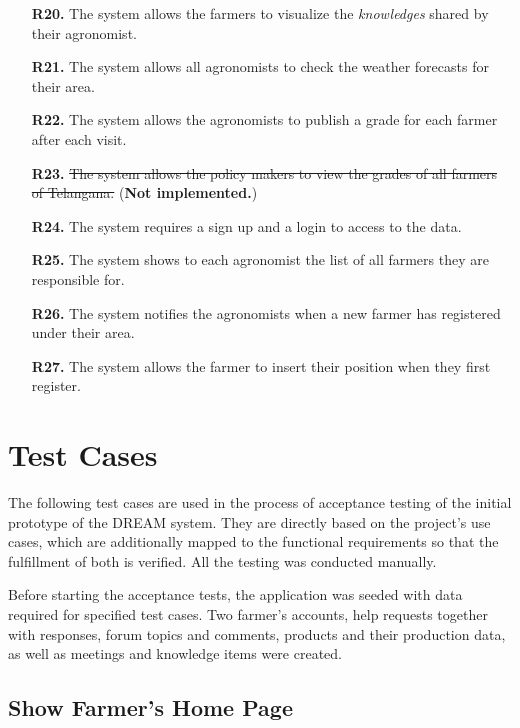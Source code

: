 \begin{enumerate}
	\item [\textbf{R20.}] The system allows the farmers to visualize the \textit{knowledges} shared by their agronomist.
	\item [\textbf{R21.}] The system allows all agronomists to check the weather forecasts for their area.
	\item [\textbf{R22.}] The system allows the agronomists to publish a grade for each farmer after each visit.
	\item [\textbf{R23.}] \sout{The system allows the policy makers to view the grades of all farmers of Telangana.} (\textbf{Not implemented.})
	\item [\textbf{R24.}] The system requires a sign up and a login to access to the data.
	\item [\textbf{R25.}] The system shows to each agronomist the list of all farmers they are responsible for.
	\item [\textbf{R26.}] The system notifies the agronomists when a new farmer has registered under their area.
	\item [\textbf{R27.}] The system allows the farmer to insert their position when they first register.
\end{enumerate}

\section{Test Cases} \label{sec:test_cases}

The following test cases are used in the process of acceptance testing of the initial prototype of the DREAM system. They are directly based on the project's use cases, which are additionally mapped to the functional requirements so that the fulfillment of both is verified. All the testing was conducted manually.

Before starting the acceptance tests, the application was seeded with data required for specified test cases. Two farmer's accounts, help requests together with responses, forum topics and comments, products and their production data, as well as meetings and knowledge items were created.

\subsection{Show Farmer's Home Page}

